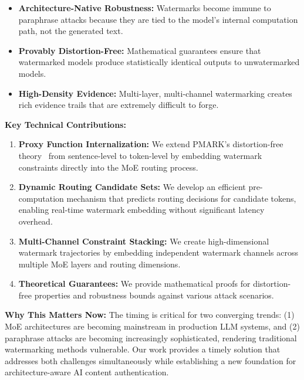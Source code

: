 \documentclass[letterpaper,twocolumn,10pt]{article}
\begin{document}
\begin{itemize}
\item \textbf{Architecture-Native Robustness:} Watermarks become immune to paraphrase attacks because they are tied to the model's internal computation path, not the generated text.
\item \textbf{Provably Distortion-Free:} Mathematical guarantees ensure that watermarked models produce statistically identical outputs to unwatermarked models.
\item \textbf{High-Density Evidence:} Multi-layer, multi-channel watermarking creates rich evidence trails that are extremely difficult to forge.
\end{itemize}

\textbf{Key Technical Contributions:}

\begin{enumerate}
\item \textbf{Proxy Function Internalization:} We extend PMARK's distortion-free theory~\cite{pmark2024} from sentence-level to token-level by embedding watermark constraints directly into the MoE routing process.

\item \textbf{Dynamic Routing Candidate Sets:} We develop an efficient pre-computation mechanism that predicts routing decisions for candidate tokens, enabling real-time watermark embedding without significant latency overhead.

\item \textbf{Multi-Channel Constraint Stacking:} We create high-dimensional watermark trajectories by embedding independent watermark channels across multiple MoE layers and routing dimensions.

\item \textbf{Theoretical Guarantees:} We provide mathematical proofs for distortion-free properties and robustness bounds against various attack scenarios.
\end{enumerate}

\textbf{Why This Matters Now:} The timing is critical for two converging trends: (1) MoE architectures are becoming mainstream in production LLM systems, and (2) paraphrase attacks are becoming increasingly sophisticated, rendering traditional watermarking methods vulnerable. Our work provides a timely solution that addresses both challenges simultaneously while establishing a new foundation for architecture-aware AI content authentication.

\end{document}
